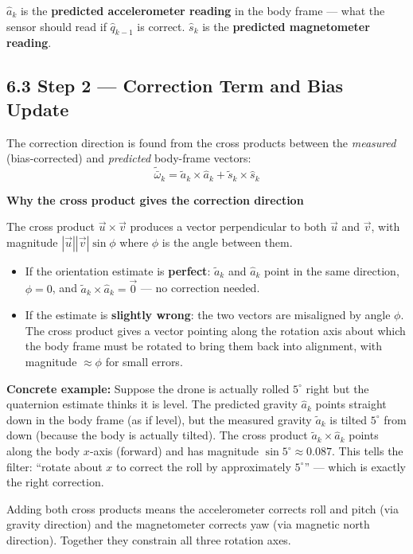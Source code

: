 \documentclass[12pt, a4paper]{article}
\begin{document}
$\hat{a}_k$ is the \textbf{predicted accelerometer reading} in the body
frame --- what the sensor should read if $\hat{q}_{k-1}$ is correct.
$\hat{s}_k$ is the \textbf{predicted magnetometer reading}.

\subsection*{6.3 \quad Step 2 --- Correction Term and Bias Update}

The correction direction is found from the cross products between the
\emph{measured} (bias-corrected) and \emph{predicted} body-frame vectors:
\[
  \tilde{\bar{\omega}}_k
  = \tilde{a}_k \times \hat{a}_k
  + \tilde{s}_k \times \hat{s}_k
\]

\begin{notebox}
  \textbf{Why the cross product gives the correction direction}

  The cross product $\vec{u}\times\vec{v}$ produces a vector perpendicular
  to both $\vec{u}$ and $\vec{v}$, with magnitude
  $|\vec{u}||\vec{v}|\sin\phi$ where $\phi$ is the angle between them.

  \begin{itemize}[leftmargin=1.2em, itemsep=3pt]
    \item If the orientation estimate is \textbf{perfect}: $\tilde{a}_k$
      and $\hat{a}_k$ point in the same direction, $\phi = 0$, and
      $\tilde{a}_k\times\hat{a}_k = \vec{0}$ --- no correction needed.

    \item If the estimate is \textbf{slightly wrong}: the two vectors are
      misaligned by angle $\phi$.
      The cross product gives a vector pointing along the rotation axis
      about which the body frame must be rotated to bring them back into
      alignment, with magnitude $\approx \phi$ for small errors.
  \end{itemize}

  \textbf{Concrete example:}
  Suppose the drone is actually rolled $5^\circ$ right but the quaternion
  estimate thinks it is level.
  The predicted gravity $\hat{a}_k$ points straight down in the body frame
  (as if level), but the measured gravity $\tilde{a}_k$ is tilted $5^\circ$
  from down (because the body is actually tilted).
  The cross product $\tilde{a}_k\times\hat{a}_k$ points along the body
  $x$-axis (forward) and has magnitude $\sin 5^\circ \approx 0.087$.
  This tells the filter: ``rotate about $x$ to correct the roll by
  approximately $5^\circ$'' --- which is exactly the right correction.

  Adding both cross products means the accelerometer corrects roll and
  pitch (via gravity direction) and the magnetometer corrects yaw (via
  magnetic north direction).
  Together they constrain all three rotation axes.
\end{notebox}
\end{document}
